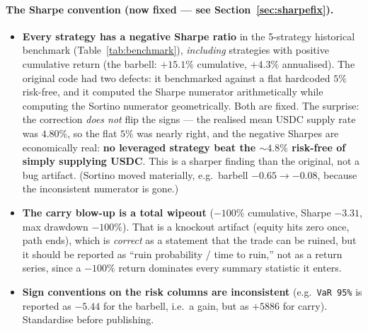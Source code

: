 \documentclass[11pt]{article}
\newcommand{\code}[1]{\texttt{\small #1}}
\begin{document}
\paragraph{The Sharpe convention (now fixed --- see Section~\ref{sec:sharpefix}).}
\begin{itemize}
  \item \textbf{Every strategy has a negative Sharpe ratio} in the 5-strategy
  historical benchmark (Table~\ref{tab:benchmark}), \emph{including} strategies
  with positive cumulative return (the barbell: $+15.1\%$ cumulative, $+4.3\%$
  annualised). The original code had two defects: it benchmarked against a flat
  hardcoded $5\%$ risk-free, and it computed the Sharpe numerator arithmetically
  while computing the Sortino numerator geometrically. Both are fixed. The
  surprise: the correction \emph{does not} flip the signs --- the realised mean
  USDC supply rate was $4.80\%$, so the flat $5\%$ was nearly right, and the
  negative Sharpes are economically real: \textbf{no leveraged strategy beat the
  $\sim$$4.8\%$ risk-free of simply supplying USDC}. This is a sharper finding
  than the original, not a bug artifact. (Sortino moved materially, e.g.\ barbell
  $-0.65 \to -0.08$, because the inconsistent numerator is gone.)
  \item \textbf{The carry blow-up is a total wipeout} ($-100\%$ cumulative,
  Sharpe $-3.31$, max drawdown $-100\%$). That is a knockout artifact (equity
  hits zero once, path ends), which is \emph{correct} as a statement that the
  trade can be ruined, but it should be reported as ``ruin probability / time to
  ruin,'' not as a return series, since a $-100\%$ return dominates every summary
  statistic it enters.
  \item \textbf{Sign conventions on the risk columns are inconsistent}
  (e.g.\ \code{VaR 95\%} is reported as $-5.44$ for the barbell, i.e.\ a gain,
  but as $+5886$ for carry). Standardise before publishing.
\end{itemize}
\end{document}
